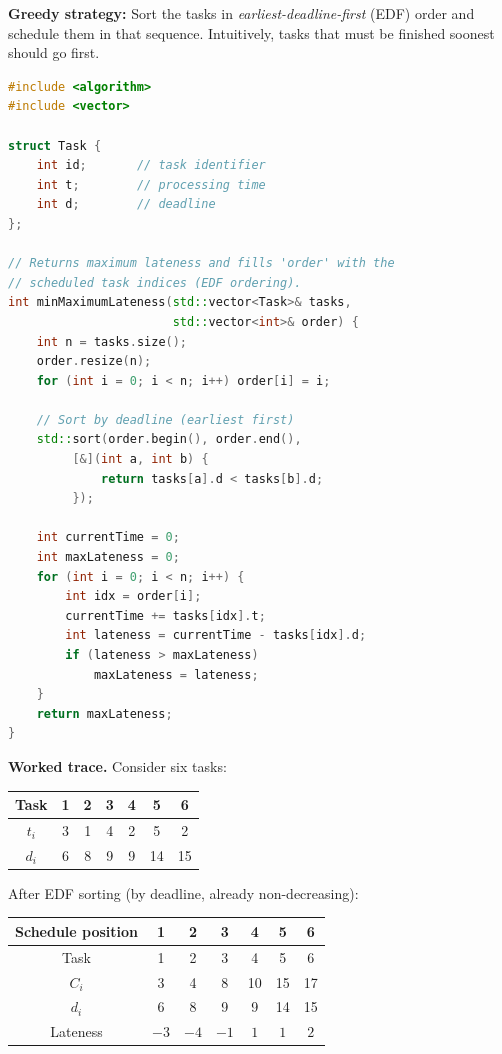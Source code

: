 \textbf{Greedy strategy:} Sort the tasks in \emph{earliest-deadline-first} (EDF) order and schedule them in that sequence. Intuitively, tasks that must be finished soonest should go first.

\begin{lstlisting}[language=C++]
#include <algorithm>
#include <vector>

struct Task {
    int id;       // task identifier
    int t;        // processing time
    int d;        // deadline
};

// Returns maximum lateness and fills 'order' with the
// scheduled task indices (EDF ordering).
int minMaximumLateness(std::vector<Task>& tasks,
                       std::vector<int>& order) {
    int n = tasks.size();
    order.resize(n);
    for (int i = 0; i < n; i++) order[i] = i;

    // Sort by deadline (earliest first)
    std::sort(order.begin(), order.end(),
         [&](int a, int b) {
             return tasks[a].d < tasks[b].d;
         });

    int currentTime = 0;
    int maxLateness = 0;
    for (int i = 0; i < n; i++) {
        int idx = order[i];
        currentTime += tasks[idx].t;
        int lateness = currentTime - tasks[idx].d;
        if (lateness > maxLateness)
            maxLateness = lateness;
    }
    return maxLateness;
}
\end{lstlisting}

\textbf{Worked trace.} Consider six tasks:

\begin{center}
\begin{tabular}{c|cccccc}
Task & 1 & 2 & 3 & 4 & 5 & 6 \\\hline
$t_i$ & 3 & 1 & 4 & 2 & 5 & 2 \\
$d_i$ & 6 & 8 & 9 & 9 & 14 & 15
\end{tabular}
\end{center}

After EDF sorting (by deadline, already non-decreasing):

\begin{center}
\begin{tabular}{c|cccccc}
Schedule position & 1 & 2 & 3 & 4 & 5 & 6 \\\hline
Task & 1 & 2 & 3 & 4 & 5 & 6 \\
$C_i$ & 3 & 4 & 8 & 10 & 15 & 17 \\
$d_i$ & 6 & 8 & 9 & 9 & 14 & 15 \\
Lateness & $-3$ & $-4$ & $-1$ & $1$ & $1$ & $2$
\end{tabular}
\end{center}

